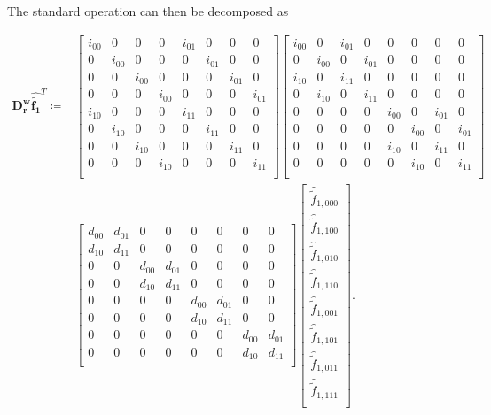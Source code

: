 \documentclass[12pt,Bold,letterpaper,TexShade]{mcgilletdclass}
\numberwithin{equation}{section}
\newcommand{\mat}[1]{\bm{{#1}}}
\newcommand{\vect}[1]{\bm{{#1}}}
\begin{document}
The standard operation can then be decomposed as

\begin{align*}
\mat{D^{w}_r} \vect{\hat{\tilde{f_1}}}^T
\coloneqq &
\begin{bmatrix}
i_{00} & 0 & 0 & 0 & i_{01} & 0 & 0 & 0 \\
0 & i_{00} & 0 & 0 & 0 & i_{01} & 0 & 0 \\
0 & 0 & i_{00} & 0 & 0 & 0 & i_{01} & 0 \\
0 & 0 & 0 & i_{00} & 0 & 0 & 0 & i_{01} \\
i_{10} & 0 & 0 & 0 & i_{11} & 0 & 0 & 0 \\
0 & i_{10} & 0 & 0 & 0 & i_{11} & 0 & 0 \\
0 & 0 & i_{10} & 0 & 0 & 0 & i_{11} & 0 \\
0 & 0 & 0 & i_{10} & 0 & 0 & 0 & i_{11} \\
\end{bmatrix}
\begin{bmatrix}
i_{00} & 0 & i_{01} & 0 & 0 & 0 & 0 & 0 \\
0 & i_{00} & 0 & i_{01} & 0 & 0 & 0 & 0 \\
i_{10} & 0 & i_{11} & 0 & 0 & 0 & 0 & 0 \\
0 & i_{10} & 0 & i_{11} & 0 & 0 & 0 & 0 \\
0 & 0 & 0 & 0 & i_{00} & 0 & i_{01} & 0 \\
0 & 0 & 0 & 0 & 0 & i_{00} & 0 & i_{01} \\
0 & 0 & 0 & 0 & i_{10} & 0 & i_{11} & 0 \\
0 & 0 & 0 & 0 & 0 & i_{10} & 0 & i_{11} \\
\end{bmatrix} \\
&
\begin{bmatrix}
d_{00} & d_{01} & 0 & 0 & 0 & 0 & 0 & 0 \\
d_{10} & d_{11} & 0 & 0 & 0 & 0 & 0 & 0 \\
0 & 0 & d_{00} & d_{01} & 0 & 0 & 0 & 0 \\
0 & 0 & d_{10} & d_{11} & 0 & 0 & 0 & 0 \\
0 & 0 & 0 & 0 & d_{00} & d_{01} & 0 & 0 \\
0 & 0 & 0 & 0 & d_{10} & d_{11} & 0 & 0 \\
0 & 0 & 0 & 0 & 0 & 0 & d_{00} & d_{01} \\
0 & 0 & 0 & 0 & 0 & 0 & d_{10} & d_{11} \\
\end{bmatrix}
\begin{bmatrix}
\hat{\tilde{f}}_{1,000} \\
\hat{\tilde{f}}_{1,100} \\
\hat{\tilde{f}}_{1,010} \\
\hat{\tilde{f}}_{1,110} \\
\hat{\tilde{f}}_{1,001} \\
\hat{\tilde{f}}_{1,101} \\
\hat{\tilde{f}}_{1,011} \\
\hat{\tilde{f}}_{1,111} \\
\end{bmatrix}.
\end{align*}
\end{document}
